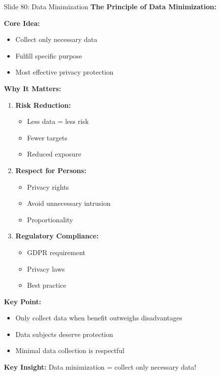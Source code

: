 \documentclass[8pt]{beamer}
\begin{document}
	\begin{frame}{Slide 80: Data Minimization}
		\fontsize{6.5}{7.5}\selectfont
		\textbf{The Principle of Data Minimization:}
		
		\vspace{0.1cm}
		\textbf{Core Idea:}
		\begin{itemize}
			\item Collect only necessary data
			\item Fulfill specific purpose
			\item Most effective privacy protection
		\end{itemize}
		
		\vspace{0.1cm}
		\textbf{Why It Matters:}
		\begin{enumerate}
			\item \textbf{Risk Reduction:}
			\begin{itemize}
				\item Less data = less risk
				\item Fewer targets
				\item Reduced exposure
			\end{itemize}
			\item \textbf{Respect for Persons:}
			\begin{itemize}
				\item Privacy rights
				\item Avoid unnecessary intrusion
				\item Proportionality
			\end{itemize}
			\item \textbf{Regulatory Compliance:}
			\begin{itemize}
				\item GDPR requirement
				\item Privacy laws
				\item Best practice
			\end{itemize}
		\end{enumerate}
		
		\vspace{0.1cm}
		\textbf{Key Point:}
		\begin{itemize}
			\item Only collect data when benefit outweighs disadvantages
			\item Data subjects deserve protection
			\item Minimal data collection is respectful
		\end{itemize}
		
		\textcolor{myblue}{\textbf{Key Insight:}} Data minimization = \textcolor{myblue}{collect only necessary data}!
	\end{frame}
	
\end{document}
